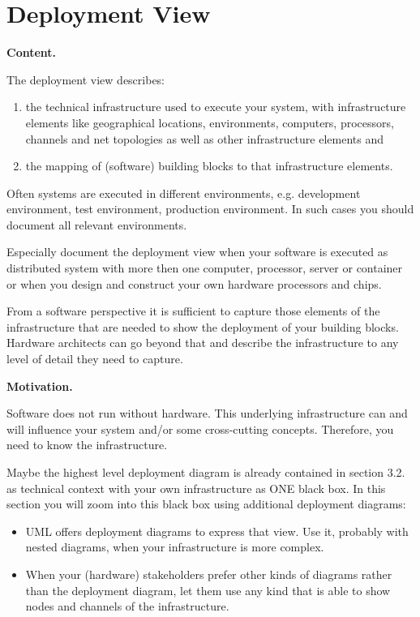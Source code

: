 \documentclass[]{article}
\begin{document}
\hypertarget{section-deployment-view}{%
\section{Deployment View}\label{section-deployment-view}}

\textbf{Content.}

The deployment view describes:

\begin{enumerate}
\def\labelenumi{\arabic{enumi}.}
\item
  the technical infrastructure used to execute your system, with
  infrastructure elements like geographical locations, environments,
  computers, processors, channels and net topologies as well as other
  infrastructure elements and
\item
  the mapping of (software) building blocks to that infrastructure
  elements.
\end{enumerate}

Often systems are executed in different environments, e.g. development
environment, test environment, production environment. In such cases you
should document all relevant environments.

Especially document the deployment view when your software is executed
as distributed system with more then one computer, processor, server or
container or when you design and construct your own hardware processors
and chips.

From a software perspective it is sufficient to capture those elements
of the infrastructure that are needed to show the deployment of your
building blocks. Hardware architects can go beyond that and describe the
infrastructure to any level of detail they need to capture.

\textbf{Motivation.}

Software does not run without hardware. This underlying infrastructure
can and will influence your system and/or some cross-cutting concepts.
Therefore, you need to know the infrastructure.

Maybe the highest level deployment diagram is already contained in
section 3.2. as technical context with your own infrastructure as ONE
black box. In this section you will zoom into this black box using
additional deployment diagrams:

\begin{itemize}
\item
  UML offers deployment diagrams to express that view. Use it, probably
  with nested diagrams, when your infrastructure is more complex.
\item
  When your (hardware) stakeholders prefer other kinds of diagrams
  rather than the deployment diagram, let them use any kind that is able
  to show nodes and channels of the infrastructure.
\end{itemize}
\end{document}
